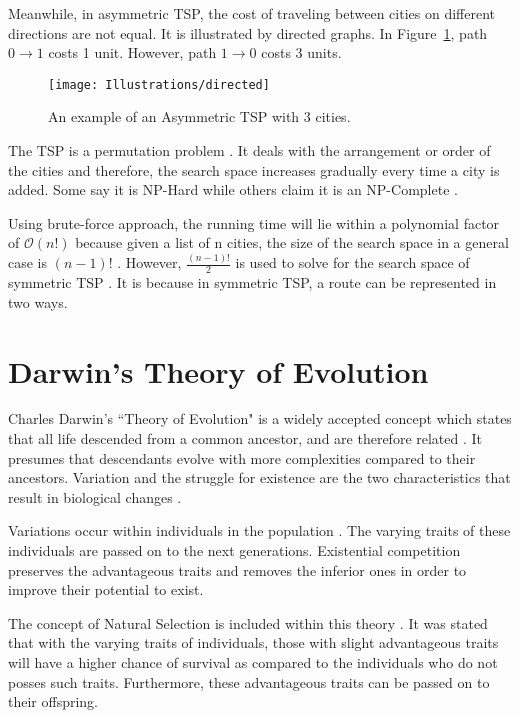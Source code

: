 Meanwhile, in asymmetric TSP, the cost of traveling between cities on different directions are not equal. It is illustrated by directed graphs. In Figure~\ref{fig:Assymetric}, path $0 \rightarrow 1$ costs 1 unit. However, path $1 \rightarrow 0$ costs 3 units. \par 

\begin{figure}[H]
	\caption{An example of an Asymmetric TSP with 3 cities.}
	\texttt{[image: Illustrations/directed]}
	\centering
	\label{fig:Assymetric}
\end{figure}


The TSP is a permutation problem \cite{gupta2012study}. It deals with the arrangement or order of the cities and therefore, the search space increases gradually every time a city is added. Some say it is NP-Hard while others claim it is an NP-Complete \cite{salvador2010traveling,haist2007optical}.  \par
Using brute-force approach, the running time will lie within a polynomial factor of $\mathcal{O}(n!)$ because given a list of n cities, the size of the search space in a general case is $(n-1)!$ \cite{jain2017solving, hahsler2007tsp}. However, $\frac{(n-1)!}{2}$ is used to solve for the search space of symmetric TSP \cite{singh2013study}. It is because in symmetric TSP, a route can be represented in two ways.\par 


\section{Darwin's Theory of Evolution}
\indent \indent Charles Darwin's ``Theory of Evolution" is a widely accepted concept which states that all life descended from a common ancestor, and are therefore related \cite{alzohairy}. It presumes that descendants evolve with more complexities compared to their ancestors. Variation and the struggle for existence are the two characteristics that result in biological changes \cite{darwin}. \par 

Variations occur within individuals in the population \cite{darwin}. The varying traits of these individuals are passed on to the next generations. Existential competition preserves the advantageous traits and removes the inferior ones in order to improve their potential to exist. \par 

The concept of Natural Selection is included within this theory \cite{darwin}. It was stated that with the varying traits of individuals, those with slight advantageous traits will have a higher chance of survival as compared to the individuals who do not posses such traits. Furthermore, these advantageous traits can be passed on to their offspring.

